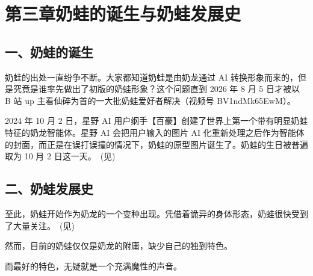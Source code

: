 
\clearpage
\section{第三章\quad 奶蛙的诞生与奶蛙发展史}

\subsection{一、奶蛙的诞生}

奶蛙的出处一直纷争不断。大家都知道奶蛙是由奶龙通过 AI 转换形象而来的，但是究竟是谁率先做出了初版的奶蛙形象？这个问题直到 2026 年 8 月 5 日才被以 B 站 up 主看仙碎为首的一大批奶蛙爱好者解决（视频号 BV1ndMk65EwM）。

2024 年 10 月 2 日，星野 AI 用户纲手【百豪】创建了世界上第一个带有明显奶蛙特征的奶龙智能体。星野 AI 会把用户输入的图片 AI 化重新处理之后作为智能体的封面，而正是在误打误撞的情况下，奶蛙的原型图片诞生了。奶蛙的生日被普遍取为 10 月 2 日这一天。~(见)



\subsection{二、奶蛙发展史}

至此，奶蛙开始作为奶龙的一个变种出现。凭借着诡异的身体形态，奶蛙很快受到了大量关注。~(见)



然而，目前的奶蛙仅仅是奶龙的附庸，缺少自己的独到特色。

而最好的特色，无疑就是一个充满魔性的声音。

